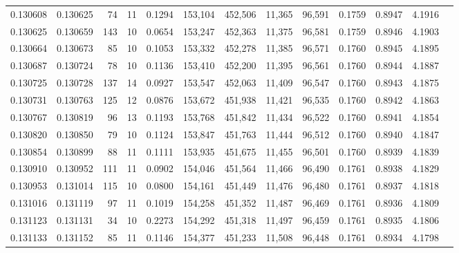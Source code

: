 \begin{tabular}{rrrrrrrrrrrrr}
0.130608 & 0.130625 &    74 &  11 &                                     0.1294 & 153,104 & 452,506 &  11,365 &  96,591 & 0.1759 & 0.8947 & 4.1916 \\
0.130625 & 0.130659 &   143 &  10 &                                     0.0654 & 153,247 & 452,363 &  11,375 &  96,581 & 0.1759 & 0.8946 & 4.1903 \\
0.130664 & 0.130673 &    85 &  10 &                                     0.1053 & 153,332 & 452,278 &  11,385 &  96,571 & 0.1760 & 0.8945 & 4.1895 \\
0.130687 & 0.130724 &    78 &  10 &                                     0.1136 & 153,410 & 452,200 &  11,395 &  96,561 & 0.1760 & 0.8944 & 4.1887 \\
0.130725 & 0.130728 &   137 &  14 &                                     0.0927 & 153,547 & 452,063 &  11,409 &  96,547 & 0.1760 & 0.8943 & 4.1875 \\
0.130731 & 0.130763 &   125 &  12 &                                     0.0876 & 153,672 & 451,938 &  11,421 &  96,535 & 0.1760 & 0.8942 & 4.1863 \\
0.130767 & 0.130819 &    96 &  13 &                                     0.1193 & 153,768 & 451,842 &  11,434 &  96,522 & 0.1760 & 0.8941 & 4.1854 \\
0.130820 & 0.130850 &    79 &  10 &                                     0.1124 & 153,847 & 451,763 &  11,444 &  96,512 & 0.1760 & 0.8940 & 4.1847 \\
0.130854 & 0.130899 &    88 &  11 &                                     0.1111 & 153,935 & 451,675 &  11,455 &  96,501 & 0.1760 & 0.8939 & 4.1839 \\
0.130910 & 0.130952 &   111 &  11 &                                     0.0902 & 154,046 & 451,564 &  11,466 &  96,490 & 0.1761 & 0.8938 & 4.1829 \\
0.130953 & 0.131014 &   115 &  10 &                                     0.0800 & 154,161 & 451,449 &  11,476 &  96,480 & 0.1761 & 0.8937 & 4.1818 \\
0.131016 & 0.131119 &    97 &  11 &                                     0.1019 & 154,258 & 451,352 &  11,487 &  96,469 & 0.1761 & 0.8936 & 4.1809 \\
0.131123 & 0.131131 &    34 &  10 &                                     0.2273 & 154,292 & 451,318 &  11,497 &  96,459 & 0.1761 & 0.8935 & 4.1806 \\
0.131133 & 0.131152 &    85 &  11 &                                     0.1146 & 154,377 & 451,233 &  11,508 &  96,448 & 0.1761 & 0.8934 & 4.1798 \\

\end{tabular}
